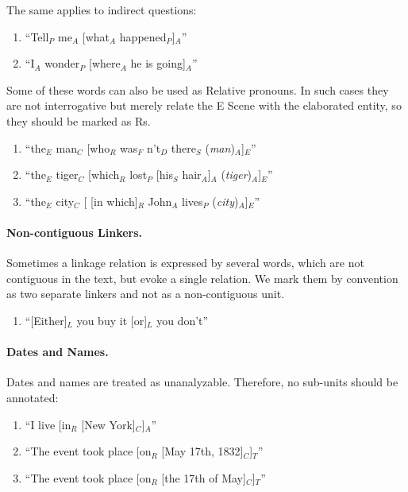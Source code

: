 \documentclass[11pt]{article}
\newcommand{\be}{\begin{enumerate}}
\newcommand{\ee}{\end{enumerate}}
\newcommand{\orig}[1]{{\color{red} {#1}}}
\newcommand{\rem}[1]{{(\it #1})}
\begin{document}
The same applies to indirect questions:

\be
\item 
``Tell$_P$ me$_A$ [what$_A$ happened$_P$]$_A$''
\item
``I$_A$ wonder$_P$ [where$_A$ he is going]$_A$''
\ee

\noindent
Some of these words can also be used as Relative pronouns. In such cases they are not interrogative but merely 
relate the E Scene with the elaborated entity, so they should be marked as Rs.

\be
\item
``the$_E$ man$_C$ [who$_R$ was$_F$ n't$_D$ there$_{S}$ \rem{man}$_A$]$_{E}$''

\item
``the$_E$ tiger$_C$ [which$_R$ lost$_P$ [his$_S$ hair$_A$]$_A$ \rem{tiger}$_A$]$_{E}$''
\item
``the$_E$ city$_C$ [ [in which]$_R$ John$_A$ lives$_P$ \rem{city}$_A$]$_{E}$''
\ee



\paragraph{Non-contiguous Linkers.} 
Sometimes a linkage relation is expressed by several words, which are not contiguous in the text, but evoke a single relation. We mark them by convention as two separate linkers and not as a non-contiguous unit.
\be \item
``[Either]$_L$ you buy it [or]$_L$ you don't''
\ee

\paragraph{Dates and Names.} Dates and names are treated as unanalyzable. Therefore, no sub-units should be annotated:
\be \item
``I live [in$_R$ [New York]$_C$]$_A$''
\item
``The event took place [on$_R$ [May 17th, 1832]$_C$]$_T$''
\item
``The event took place [on$_R$ [the 17th of May]$_C$]$_T$''
\ee
\end{document}
